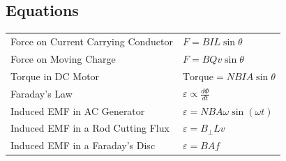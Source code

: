 \documentclass[a4paper,11pt]{article}
\begin{document}
	\subsection{Equations}
	\begin{center}
		\renewcommand{\arraystretch}{1.2}
		\begin{tabular}{@{} l C{9cm} @{}}
			\toprule
			Force on Current Carrying Conductor & $F = BIL\sin\theta$\\
			Force on Moving Charge & $F = BQv\sin\theta$\\
			Torque in DC Motor & $\text{Torque} = NBIA\sin\theta$\\
			Faraday's Law & $\varepsilon \propto \frac{d\Phi}{dt}$\\
			Induced EMF in AC Generator & $\varepsilon = NBA\omega\sin\left(\omega t\right)$\\
			Induced EMF in a Rod Cutting Flux & $\varepsilon = B_\perp Lv$\\
			Induced EMF in a Faraday's Disc & $\varepsilon = BAf$\\
			\bottomrule
		\end{tabular}
	\end{center}
\end{document}
